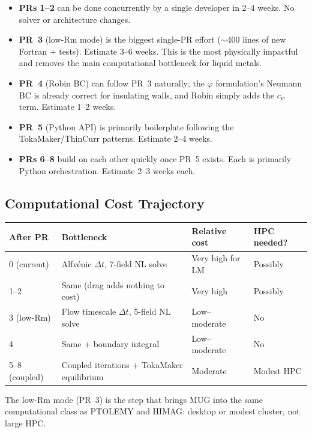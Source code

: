 \documentclass[11pt,letterpaper]{article}
\begin{document}
\begin{itemize}
  \item \textbf{PRs 1--2} can be done concurrently by a single developer in
    2--4 weeks.  No solver or architecture changes.
  \item \textbf{PR~3} (low-Rm mode) is the biggest single-PR effort
    ($\sim$400 lines of new Fortran + tests).  Estimate 3--6 weeks.
    This is the most physically impactful and removes the main computational
    bottleneck for liquid metals.
  \item \textbf{PR~4} (Robin BC) can follow PR~3 naturally; the $\varphi$
    formulation's Neumann BC is already correct for insulating walls, and
    Robin simply adds the $c_w$ term.  Estimate 1--2 weeks.
  \item \textbf{PR~5} (Python API) is primarily boilerplate following the
    TokaMaker/ThinCurr patterns.  Estimate 2--4 weeks.
  \item \textbf{PRs 6--8} build on each other quickly once PR~5 exists.
    Each is primarily Python orchestration.  Estimate 2--3 weeks each.
\end{itemize}

\subsection{Computational Cost Trajectory}

\begin{center}
\begin{tabular}{llll}
\toprule
\textbf{After PR} & \textbf{Bottleneck} & \textbf{Relative cost} & \textbf{HPC needed?} \\
\midrule
0 (current) & Alfvénic $\Delta t$, 7-field NL solve & Very high for LM & Possibly \\
1--2 & Same (drag adds nothing to cost) & Very high & Possibly \\
3 (low-Rm) & Flow timescale $\Delta t$, 5-field NL solve & Low--moderate & No \\
4 & Same + boundary integral & Low--moderate & No \\
5--8 (coupled) & Coupled iterations + TokaMaker equilibrium & Moderate & Modest HPC \\
\bottomrule
\end{tabular}
\end{center}

The low-Rm mode (PR~3) is the step that brings MUG into the same computational
class as PTOLEMY and HIMAG: desktop or modest cluster, not large HPC.
\end{document}
